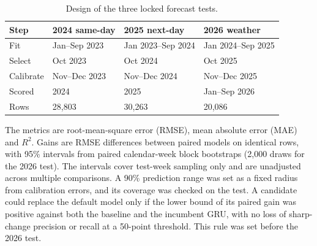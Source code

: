 \documentclass[pdflatex,sn-mathphys-num]{sn-jnl}
\begin{document}
\begin{table}[!htbp]
\centering
\small
\caption{Design of the three locked forecast tests.}\label{tab:design}
\begin{tabular}{llll}
\toprule
\textbf{Step} & \textbf{2024 same-day} & \textbf{2025 next-day} & \textbf{2026 weather} \\
\midrule
Fit & Jan--Sep 2023 & Jan 2023--Sep 2024 & Jan 2024--Sep 2025 \\
Select & Oct 2023 & Oct 2024 & Oct 2025 \\
Calibrate & Nov--Dec 2023 & Nov--Dec 2024 & Nov--Dec 2025 \\
Scored & 2024 & 2025 & Jan--Sep 2026 \\
Rows & 28,803 & 30,263 & 20,086 \\
\bottomrule
\end{tabular}
\end{table}

The metrics are root-mean-square error (RMSE), mean absolute error (MAE) and $R^2$. Gains are RMSE differences between paired models on identical rows, with 95\% intervals from paired calendar-week block bootstraps (2,000 draws for the 2026 test). The intervals cover test-week sampling only and are unadjusted across multiple comparisons. A 90\% prediction range was set as a fixed radius from calibration errors, and its coverage was checked on the test. A candidate could replace the default model only if the lower bound of its paired gain was positive against both the baseline and the incumbent GRU, with no loss of sharp-change precision or recall at a 50-point threshold. This rule was set before the 2026 test.
\end{document}
